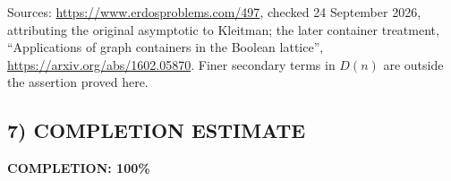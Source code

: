 Sources: \url{https://www.erdosproblems.com/497}, checked 24 September 2026, attributing the original asymptotic to Kleitman; the later container treatment, ``Applications of graph containers in the Boolean lattice'', \url{https://arxiv.org/abs/1602.05870}. Finer secondary terms in $D(n)$ are outside the assertion proved here.

\subsection*{7) COMPLETION ESTIMATE}
\textbf{COMPLETION: 100\%}
